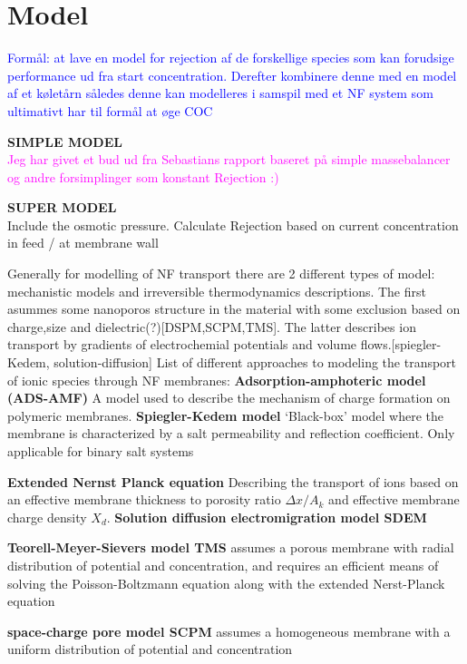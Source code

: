 \section{Model}

\textcolor{blue}{Formål: at lave en model for rejection af de forskellige species som kan forudsige performance ud fra start concentration. Derefter kombinere denne med en model af et køletårn således denne kan modelleres i samspil med et NF system som ultimativt har til formål at øge COC}

\textbf{SIMPLE MODEL}\\
\textcolor{magenta}{Jeg har givet et bud ud fra Sebastians rapport baseret på simple massebalancer og andre forsimplinger som konstant Rejection :) }


\textbf{SUPER MODEL}\\
Include the osmotic pressure. 
Calculate Rejection based on current concentration in feed / at membrane wall

Generally for modelling of NF transport there are 2 different types of model: mechanistic models and
irreversible thermodynamics descriptions. The first asummes some nanoporos structure in the material with some exclusion based on charge,size and dielectric(?)[DSPM,SCPM,TMS]. The latter describes ion transport by gradients of electrochemial potentials and volume flows.[spiegler-Kedem, solution-diffusion]
List of different approaches to modeling the transport of ionic species through NF membranes:
\textbf{Adsorption-amphoteric model (ADS-AMF)}
A model used to describe the mechanism of charge formation on polymeric membranes.
\textbf{Spiegler-Kedem model}
‘Black-box’ model where the membrane is characterized by a salt permeability and reflection coefficient.
Only applicable for binary salt systems

\textbf{Extended Nernst Planck equation}
Describing the transport of ions based on an effective membrane thickness to porosity ratio $\Delta x/A_k$  and effective membrane charge density $X_d$. 
\textbf{Solution diffusion electromigration model SDEM} 

\textbf{Teorell-Meyer-Sievers model TMS}
assumes a porous membrane with radial
distribution of potential and concentration, and requires an efficient means of solving the Poisson-Boltzmann
equation along with the extended Nerst-Planck equation

\textbf{space-charge pore model SCPM}
assumes a homogeneous membrane with a uniform distribution of potential and concentration


